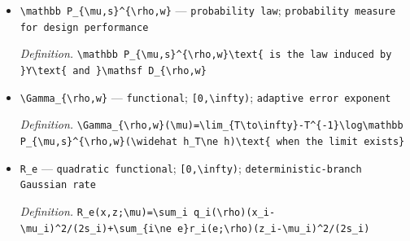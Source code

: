 \documentclass{article}
\begin{document}
\begin{itemize}
  \item \texttt{\textbackslash{}\allowbreak{}mathbb P\_\allowbreak{}\{\textbackslash{}\allowbreak{}mu,\allowbreak{}s\}\allowbreak{}\textasciicircum{}\{\textbackslash{}\allowbreak{}rho,\allowbreak{}w\}\allowbreak{}} --- \texttt{probability law}; \texttt{probability measure for design performance}
  \par\smallskip\noindent\emph{Definition.} \texttt{\textbackslash{}\allowbreak{}mathbb P\_\allowbreak{}\{\textbackslash{}\allowbreak{}mu,\allowbreak{}s\}\allowbreak{}\textasciicircum{}\{\textbackslash{}\allowbreak{}rho,\allowbreak{}w\}\allowbreak{}\textbackslash{}\allowbreak{}text\{ is the law induced by \}\allowbreak{}Y\textbackslash{}\allowbreak{}text\{ and \}\allowbreak{}\textbackslash{}\allowbreak{}mathsf D\_\allowbreak{}\{\textbackslash{}\allowbreak{}rho,\allowbreak{}w\}\allowbreak{}}
  \item \texttt{\textbackslash{}\allowbreak{}Gamma\_\allowbreak{}\{\textbackslash{}\allowbreak{}rho,\allowbreak{}w\}\allowbreak{}} --- \texttt{functional}; \texttt{[0,\allowbreak{}\textbackslash{}\allowbreak{}infty)}; \texttt{adaptive error exponent}
  \par\smallskip\noindent\emph{Definition.} \texttt{\textbackslash{}\allowbreak{}Gamma\_\allowbreak{}\{\textbackslash{}\allowbreak{}rho,\allowbreak{}w\}\allowbreak{}(\textbackslash{}\allowbreak{}mu)=\allowbreak{}\textbackslash{}\allowbreak{}lim\_\allowbreak{}\{T\textbackslash{}\allowbreak{}to\textbackslash{}\allowbreak{}infty\}\allowbreak{}-\allowbreak{}T\textasciicircum{}\{-\allowbreak{}1\}\allowbreak{}\textbackslash{}\allowbreak{}log\textbackslash{}\allowbreak{}mathbb P\_\allowbreak{}\{\textbackslash{}\allowbreak{}mu,\allowbreak{}s\}\allowbreak{}\textasciicircum{}\{\textbackslash{}\allowbreak{}rho,\allowbreak{}w\}\allowbreak{}(\textbackslash{}\allowbreak{}widehat h\_\allowbreak{}T\textbackslash{}\allowbreak{}ne h)\textbackslash{}\allowbreak{}text\{ when the limit exists\}\allowbreak{}}
  \item \texttt{R\_\allowbreak{}e} --- \texttt{quadratic functional}; \texttt{[0,\allowbreak{}\textbackslash{}\allowbreak{}infty)}; \texttt{deterministic-\allowbreak{}branch Gaussian rate}
  \par\smallskip\noindent\emph{Definition.} \texttt{R\_\allowbreak{}e(x,\allowbreak{}z;\allowbreak{}\textbackslash{}\allowbreak{}mu)=\allowbreak{}\textbackslash{}\allowbreak{}sum\_\allowbreak{}i q\_\allowbreak{}i(\textbackslash{}\allowbreak{}rho)(x\_\allowbreak{}i-\allowbreak{}\textbackslash{}\allowbreak{}mu\_\allowbreak{}i)\textasciicircum{}2/\allowbreak{}(2s\_\allowbreak{}i)+\allowbreak{}\textbackslash{}\allowbreak{}sum\_\allowbreak{}\{i\textbackslash{}\allowbreak{}ne e\}\allowbreak{}r\_\allowbreak{}i(e;\allowbreak{}\textbackslash{}\allowbreak{}rho)(z\_\allowbreak{}i-\allowbreak{}\textbackslash{}\allowbreak{}mu\_\allowbreak{}i)\textasciicircum{}2/\allowbreak{}(2s\_\allowbreak{}i)}

\end{itemize}
\end{document}
